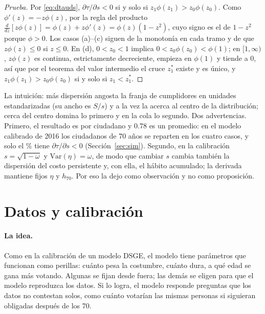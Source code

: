 \documentclass[11pt]{article}
\theoremstyle{definition}
\newcommand{\1}{\mathbbm{1}}
\begin{document}
\begin{proof}[Prueba]
Por \eqref{eq:dtauds}, $\partial\tau/\partial s<0$ si y solo si $z_1\phi(z_1)>z_0\phi(z_0)$. Como
$\phi'(z)=-z\phi(z)$, por la regla del producto
$\frac{d}{dz}[z\phi(z)]=\phi(z)+z\phi'(z)=\phi(z)(1-z^2)$, cuyo signo es el de $1-z^2$ porque
$\phi>0$. Los casos (a)--(c) siguen de la monotonía en cada tramo y de que $z\phi(z)\le0$ si $z\le0$.
En (d), $0<z_0<1$ implica $0<z_0\phi(z_0)<\phi(1)$; en $[1,\infty)$, $z\phi(z)$ es continua,
estrictamente decreciente, empieza en $\phi(1)$ y tiende a 0, así que por el teorema del valor
intermedio el cruce $z_1^*$ existe y es único, y $z_1\phi(z_1)>z_0\phi(z_0)$ si y solo si
$z_1<z_1^*$.
\end{proof}

La intuición: más dispersión angosta la franja de cumplidores en unidades estandarizadas (su ancho es
$S/s$) y a la vez la acerca al centro de la distribución; cerca del centro domina lo primero y en la
cola lo segundo. Dos advertencias. Primero, el resultado es por ciudadano y $0.78$ es un promedio: en
el modelo calibrado de 2016 los ciudadanos de 70 años se reparten en los cuatro casos, y solo el
\hetRunNeg\% tiene $\partial\tau/\partial s<0$ (Sección~\ref{sec:sim}). Segundo, en la calibración
$s=\sqrt{1-\omega}$ y $\mathrm{Var}(\eta)=\omega$, de modo que cambiar $s$ cambia también la
dispersión del costo persistente y, con ella, el hábito acumulado; la derivada mantiene fijos $\eta$
y $h_{70}$. Por eso la dejo como observación y no como proposición.

\section{Datos y calibración}\label{sec:calib}

\paragraph{La idea.} Como en la calibración de un modelo DSGE, el modelo tiene parámetros que
funcionan como perillas: cuánto pesa la costumbre, cuánto dura, a qué edad se gana más votando.
Algunas se fijan desde fuera; las demás se eligen para que el modelo reproduzca los datos. Si lo
logra, el modelo responde preguntas que los datos no contestan solos, como cuánto votarían las mismas
personas si siguieran obligadas después de los 70.
\end{document}

